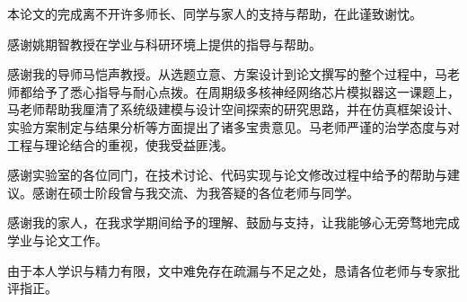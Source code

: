 本论文的完成离不开许多师长、同学与家人的支持与帮助，在此谨致谢忱。

感谢姚期智教授在学业与科研环境上提供的指导与帮助。

感谢我的导师马恺声教授。从选题立意、方案设计到论文撰写的整个过程中，马老师都给予了悉心指导与耐心点拨。在周期级多核神经网络芯片模拟器这一课题上，马老师帮助我厘清了系统级建模与设计空间探索的研究思路，并在仿真框架设计、实验方案制定与结果分析等方面提出了诸多宝贵意见。马老师严谨的治学态度与对工程与理论结合的重视，使我受益匪浅。

感谢实验室的各位同门，在技术讨论、代码实现与论文修改过程中给予的帮助与建议。感谢在硕士阶段曾与我交流、为我答疑的各位老师与同学。

感谢我的家人，在我求学期间给予的理解、鼓励与支持，让我能够心无旁骛地完成学业与论文工作。

由于本人学识与精力有限，文中难免存在疏漏与不足之处，恳请各位老师与专家批评指正。

